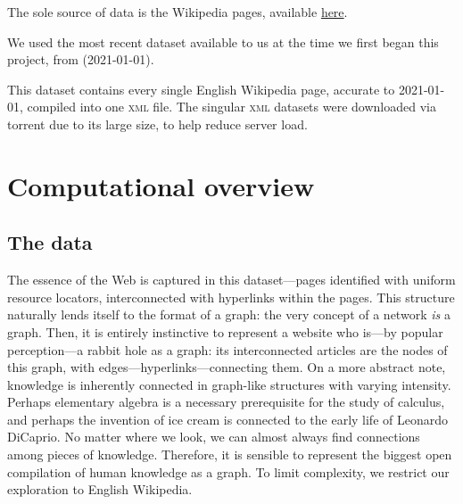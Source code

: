 \documentclass[fontsize=12pt]{article}
\begin{document}
\begin{multicols}{2}
    The sole source of data is the Wikipedia pages, available \href{https://meta.wikimedia.org/wiki/Data\_dump\_torrents\#English\_Wikipedia}{here}. \parencite{DataDumpTorrents}
    
    We used the most recent dataset available to us at the time we first began this project, from (2021-01-01).
    
    This dataset contains every single English Wikipedia page, accurate to 2021-01-01, compiled into one \textsc{xml} file. The singular \textsc{xml} datasets were downloaded via torrent due to its large size, to help reduce server load.
    
    \section{Computational overview}
    \subsection{The data}
    The essence of the Web is captured in this dataset---pages identified with uniform resource locators, interconnected with hyperlinks within the pages. This structure naturally lends itself to the format of a graph: the very concept of a network \emph{is} a graph. Then, it is entirely instinctive to represent a website who is---by popular perception---a rabbit hole as a graph: its interconnected articles are the nodes of this graph, with edges---hyperlinks---connecting them. 
    On a more abstract note, knowledge is inherently connected in graph-like structures with varying intensity. Perhaps elementary algebra is a necessary prerequisite for the study of calculus, and perhaps the invention of ice cream is connected to the early life of Leonardo DiCaprio. No matter where we look, we can almost always find connections among pieces of knowledge.
    Therefore, it is sensible to represent the biggest open compilation of human knowledge as a graph. To limit complexity, we restrict our exploration to English Wikipedia. 


\end{multicols}
\end{document}
